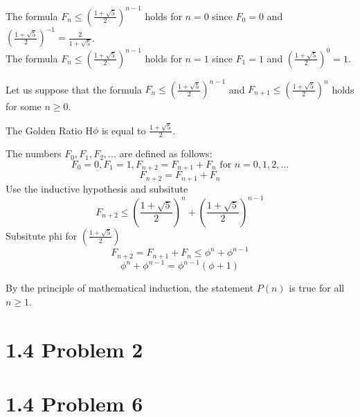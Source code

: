 \documentclass{report}
\begin{document}
\begin{basecaseWithPoppy}
    The formula $F_{n} \leq \left(\frac{1 + \sqrt{5}}{2}\right)^{n-1}$ holds for \( n = 0 \) since \( F_{0} = 0 \) and \( \left(\frac{1 + \sqrt{5}}{2}\right)^{-1} = \frac{2}{1 + \sqrt{5}} \).  \\
    The formula $F_{n} \leq \left(\frac{1 + \sqrt{5}}{2}\right)^{n-1}$ holds for \( n = 1 \) since \( F_{1} = 1 \) and \( \left(\frac{1 + \sqrt{5}}{2}\right)^{0} = 1 \). 
\end{basecaseWithPoppy}

\begin{inducthypWithRose}
    Let us suppose that the formula $F_{n} \leq \left(\frac{1 + \sqrt{5}}{2}\right)^{n-1}$ and $F_{n+1} \leq \left(\frac{1 + \sqrt{5}}{2}\right)^{n}$ holds for some \( n \geq 0 \).
\end{inducthypWithRose}    

\begin{RemarkWithLily}{The Golden Ratio}
   H$\phi$ is equal to $\frac{1 + \sqrt{5}}{2}$.    
\end{RemarkWithLily}

\begin{inductstepWithTulip}

    The numbers $F_{0}, F_{1}, F_{2}, \ldots$ are defined as follows:
        \[ F_{0} = 0, F_{1} = 1, F_{n+2} = F_{n+1} + F_{n} \text{ for } n = 0,1,2, \ldots \]
    \[ F_{n + 2} = F_{n+1} + F_{n} \]
    Use the inductive hypothesis and subsitute  
    \[ F_{n + 2} \leq \left(\frac{1 + \sqrt{5}}{2}\right)^{n} + \left(\frac{1 + \sqrt{5}}{2}\right)^{n-1}\]     
    Subsitute phi for \(\left(\frac{1 + \sqrt{5}}{2}\right)\)
    \[ F_{n + 2} = F_{n+1} + F_{n} \leq \phi^{n} + \phi^{n-1}\] 
    \[ \phi^{n}+ \phi^{n-1} = \phi^{n-1}(\phi + 1) \] 

\end{inductstepWithTulip}

\begin{keyideaWithLotus}
    By the principle of mathematical induction, the statement \( P(n) \) is true for all \( n \geq 1 \).
\end{keyideaWithLotus}


\section*{1.4 Problem 2}


\section*{1.4 Problem 6}

\end{document}
